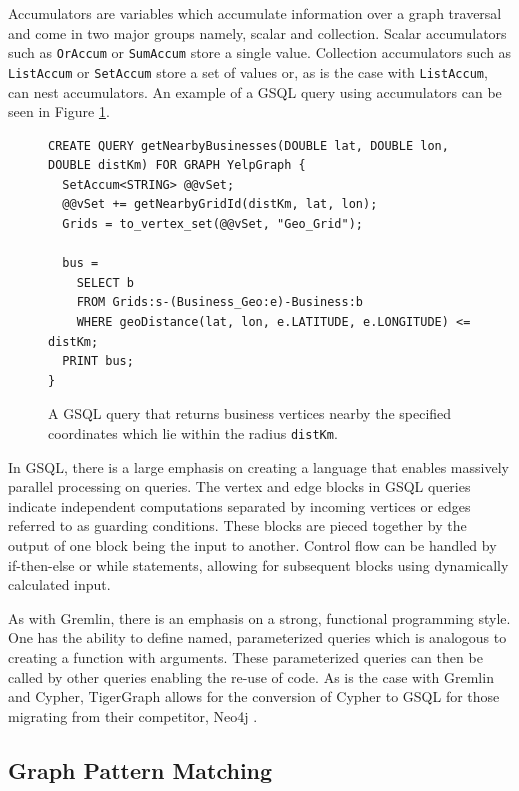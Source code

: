 Accumulators are variables which accumulate information over a graph traversal and come in two major groups namely, scalar and collection. Scalar accumulators such as \texttt{OrAccum} or \texttt{SumAccum} store a single value. Collection accumulators such as \texttt{ListAccum} or \texttt{SetAccum} store a set of values or, as is the case with \texttt{ListAccum}, can nest accumulators. An example of a GSQL query using accumulators can be seen in Figure \ref{lst:gsqlAccum}.

\begin{figure}[h]
    \centering
    \begin{lstlisting}[language=gsql]
CREATE QUERY getNearbyBusinesses(DOUBLE lat, DOUBLE lon, DOUBLE distKm) FOR GRAPH YelpGraph {
  SetAccum<STRING> @@vSet;
  @@vSet += getNearbyGridId(distKm, lat, lon);
  Grids = to_vertex_set(@@vSet, "Geo_Grid");
	
  bus =
    SELECT b
    FROM Grids:s-(Business_Geo:e)-Business:b 
    WHERE geoDistance(lat, lon, e.LATITUDE, e.LONGITUDE) <= distKm;
  PRINT bus;
}
    \end{lstlisting}
    \caption{A GSQL query that returns business vertices nearby the specified coordinates which lie within the radius \texttt{distKm}.}
    \label{lst:gsqlAccum}
\end{figure}

In GSQL, there is a large emphasis on creating a language that enables massively parallel processing on queries. The vertex and edge blocks in GSQL queries indicate independent computations separated by incoming vertices or edges referred to as guarding conditions. These blocks are pieced together by the output of one block being the input to another. Control flow can be handled by if-then-else or while statements, allowing for subsequent blocks using dynamically calculated input.

As with Gremlin, there is an emphasis on a strong, functional programming style. One has the ability to define named, parameterized queries which is analogous to creating a function with arguments. These parameterized queries can then be called by other queries enabling the re-use of code. As is the case with Gremlin and Cypher, TigerGraph allows for the conversion of Cypher to GSQL for those migrating from their competitor, Neo4j \cite{tigergraphInfoworld}.

\subsection{Graph Pattern Matching}

